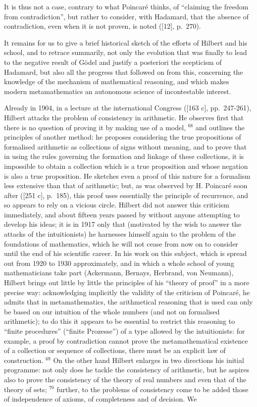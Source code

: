 It is thus not a case, contrary to what Poincaré thinks, of ``claiming the freedom from contradiction'', but rather to consider, with Hadamard, that the absence of contradiction, even when it is not proven, is noted ({[}12{]}, p.~270).

It remains for us to give a brief historical sketch of the efforts of Hilbert and his school, and to retrace summarily, not only the evolution that was finally to lead to the negative result of Gödel and justify a posteriori the scepticism of Hadamard, but also all the progress that followed on from this, concerning the knowledge of the mechanism of mathematical reasoning, and which makes modern metamathematics an autonomous science of incontestable interest.

Already in 1904, in a lecture at the international Congress ({[}163 c{]}, pp.~247-261), Hilbert attacks the problem of consistency in arithmetic. He observes first that there is no question of proving it by making use of a model, \(^{68}\) and outlines the principles of another method: he proposes considering the true propositions of formalised arithmetic as collections of signs without meaning, and to prove that in using the rules governing the formation and linkage of these collections, it is impossible to obtain a collection which is a true proposition and whose negation is also a true proposition. He sketches even a proof of this nature for a formalism less extensive than that of arithmetic; but, as was observed by H. Poincaré soon after ({[}251 c{]}, p.~185), this proof uses essentially the principle of recurrence, and so appears to rely on a vicious circle. Hilbert did not answer this criticism immediately, and about fifteen years passed by without anyone attempting to develop his ideas; it is in 1917 only that (motivated by the wish to answer the attacks of the intuitionists) he harnesses himself again to the problem of the foundations of mathematics, which he will not cease from now on to consider until the end of his scientific career. In his work on this subject, which is spread out from 1920 to 1930 approximately, and in which a whole school of young mathematicians take part (Ackermann, Bernays, Herbrand, von Neumann), Hilbert brings out little by little the principles of his ``theory of proof'' in a more precise way: acknowledging implicitly the validity of the criticism of Poincaré, he admits that in metamathematics, the arithmetical reasoning that is used can only be based on our intuition of the whole numbers (and not on formalised arithmetic); to do this it appears to be essential to restrict this reasoning to ``finite procedures'' (``finite Prozesse'') of a type allowed by the intuitionists: for example, a proof by contradiction cannot prove the metamathematical existence of a collection or sequence of collections, there must be an explicit law of construction. \(^{69}\) On the other hand Hilbert enlarges in two directions his initial programme: not only does he tackle the consistency of arithmetic, but he aspires also to prove the consistency of the theory of real numbers and even that of the theory of sets; \(^{70}\) further, to the problems of consistency come to be added those of independence of axioms, of completeness and of decision. We 